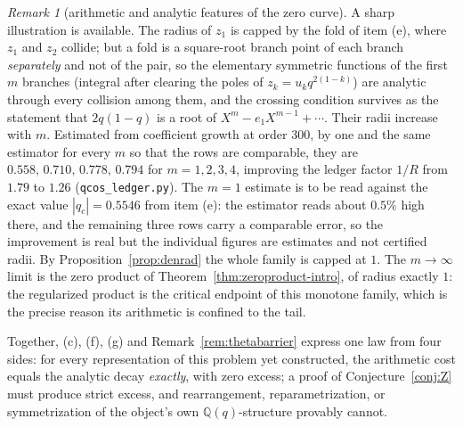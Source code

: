 \documentclass[11pt]{article}
\theoremstyle{plain}
\theoremstyle{definition}
\theoremstyle{remark}
\newtheorem{remark}[theorem]{Remark}
\newcommand{\Q}{\mathbb{Q}}
\begin{document}
\begin{remark}[arithmetic and analytic features of the zero curve]
A sharp illustration is available. The radius of $z_1$ is capped by the fold of item (e), where
$z_1$ and $z_2$ collide; but a fold is a square-root branch point of each branch \emph{separately}
and not of the pair, so the elementary symmetric functions of the first $m$ branches (integral
after clearing the poles of $z_k=u_k q^{2(1-k)}$) are analytic through every collision among
them, and the crossing condition survives as the statement that $2q(1-q)$ is a root of
$X^m-e_1X^{m-1}+\cdots$. Their radii increase with $m$. Estimated from coefficient growth at order
$300$, by one and the same estimator for every $m$ so that the rows are comparable, they are
$0.558,\,0.710,\,0.778,\,0.794$ for $m=1,2,3,4$, improving the ledger factor $1/R$ from $1.79$
to $1.26$ (\texttt{qcos\_ledger.py}). The $m=1$ estimate is to be read against the exact value
$|q_c|=0.5546$ from item (e): the estimator reads about $0.5\%$ high there, and the remaining
three rows carry a comparable error, so the improvement is real but the individual figures are
estimates and not certified radii. By Proposition~\ref{prop:denrad} the whole family is capped at
$1$. The $m\to\infty$ limit is the
zero product of Theorem~\ref{thm:zeroproduct-intro}, of radius exactly $1$: the regularized product
is the critical endpoint of this monotone family, which is the precise reason its arithmetic is
confined to the tail.

Together, (c), (f), (g) and Remark~\ref{rem:thetabarrier} express one law from four sides:
for every representation of this problem yet constructed, the arithmetic cost equals the analytic
decay \emph{exactly}, with zero excess; a proof of Conjecture~\ref{conj:Z} must produce strict
excess, and rearrangement, reparametrization, or symmetrization of the object's own
$\Q(q)$-structure provably cannot.
\end{remark}
\end{document}
